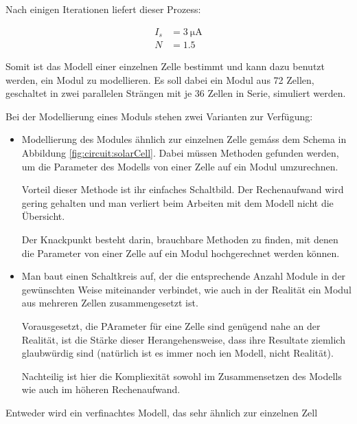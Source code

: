 Nach einigen Iterationen liefert dieser Prozess:

\begin{align}
    \label{eq:cell:diode:IS:N:result}
    I_s &= \SI{3}{\micro\ampere} \\
    N   &= 1.5
\end{align}

Somit ist  das Modell  einer einzelnen  Zelle bestimmt  und kann  dazu benutzt
werden,  ein Modul  zu modellieren. Es  soll dabei  ein Modul  aus 72  Zellen,
geschaltet in zwei parallelen Str\"angen mit  je 36 Zellen in Serie, simuliert
werden.

\myfancybreak

Bei der Modellierung eines Moduls stehen zwei Varianten zur Verf\"ugung:

\begin{itemize}
    \item
        Modellierung  des  Modules  \"ahnlich  zur  einzelnen  Zelle  gem\'ass
        dem  Schema in  Abbildung \ref{fig:circuit:solarCell}. Dabei  m\"ussen
        Methoden gefunden werden, um die Parameter des Modells von einer Zelle
        auf ein Modul umzurechnen.

        Vorteil dieser Methode ist ihr einfaches Schaltbild. Der Rechenaufwand
        wird gering  gehalten und  man verliert beim  Arbeiten mit  dem Modell
        nicht die \"Ubersicht.

        Der Knackpunkt besteht darin, brauchbare Methoden zu finden, mit denen
        die  Parameter von  einer  Zelle auf  ein  Modul hochgerechnet  werden
        k\"onnen.
    \item
        Man baut einen Schaltkreis auf, der die entsprechende Anzahl Module in
        der  gew\"unschten  Weise  miteinander  verbindet,  wie  auch  in  der
        Realit\"at ein Modul aus mehreren Zellen zusammengesetzt ist.

        Vorausgesetzt, die PArameter f\"ur eine  Zelle sind gen\"ugend nahe an
        der Realit\"at,  ist die  St\"arke dieser Herangehensweise,  dass ihre
        Resultate ziemlich  glaubw\"urdig sind (nat\"urlich ist  es immer noch
        ien Modell, nicht Realit\"at).

        Nachteilig ist  hier die  Kompliexit\"at sowohl im  Zusammensetzen des
        Modells wie auch im h\"oheren Rechenaufwand.
\end{itemize}
Entweder
wird ein verfinachtes Modell, das sehr \"ahnlich zur einzelnen Zell

